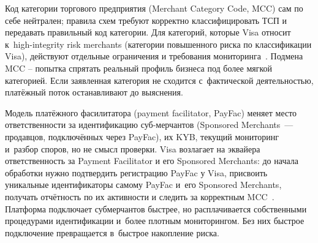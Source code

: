 Код категории торгового предприятия (Merchant Category Code, MCC)
сам по себе нейтрален; правила схем требуют
корректно классифицировать ТСП и передавать правильный код
категории. Для категорий, которые Visa относит к~high-integrity risk
merchants (категории повышенного риска по классификации Visa),
действуют отдельные ограничения и требования
мониторинга~\cite{visa-core-rules}. Подмена MCC -- попытка спрятать
реальный профиль бизнеса под более мягкой категорией. Если
заявленная категория не сходится с~фактической деятельностью,
платёжный поток останавливают до выяснения.

Модель платёжного фасилитатора (payment facilitator, PayFac)
меняет место ответственности за идентификацию суб-мерчантов
(Sponsored Merchants~--- продавцов, подключённых через PayFac),
их KYB, текущий мониторинг и~разбор споров, но не смысл проверки.
Visa возлагает
на эквайера ответственность за Payment Facilitator и его Sponsored
Merchants: до начала обработки нужно подтвердить регистрацию PayFac
у Visa, присвоить уникальные идентификаторы самому PayFac и~его
Sponsored Merchants, получать отчётность по их активности и следить
за корректным MCC~\cite{visa-core-rules}. Платформа подключает
субмерчантов быстрее, но расплачивается собственными процедурами идентификации
и~более плотным мониторингом. Без них быстрое подключение
превращается в~быстрое накопление риска.

